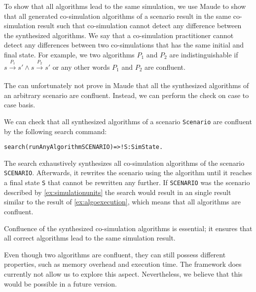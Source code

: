 To show that all algorithms lead to the same simulation, we use Maude to show that all generated co-simulation algorithms of a scenario result in the same co-simulation result such that co-simulation cannot detect any difference between the synthesized algorithms.
We say that a co-simulation practitioner cannot detect any differences between two co-simulations that has the same initial and final state.
For example, we two algorithms $P_1$ and $P_2$ are indistinguishable if $s \xrightarrow[\text{}]{P_1} s' \land s \xrightarrow[\text{}]{P_2} s'$ or any other words $P_1$ and $P_2$ are confluent.

The can unfortunately not prove in Maude that all the synthesized algorithms of an arbitrary scenario are confluent.
Instead, we can perform the check on case to case basis.  

\begin{example}
  We can check that all synthesized algorithms of a scenario \texttt{Scenario} are confluent by the following search command:
  \small
  \begin{alltt}
search (runAnyAlgorithm SCENARIO)  =>! S:SimState . 
  \end{alltt}
  \normalsize
The search exhaustively synthesizes all co-simulation algorithms of the scenario \texttt{SCENARIO}. 
Afterwards, it rewrites the scenario using the algorithm until it reaches a final state \texttt{S} that cannot be rewritten any further.
If \texttt{SCENARIO} was the scenario described by \cref{ex:simulationunits} the search would result in an single result similar to the result of \cref{ex:algoexecution}, which means that all algorithms are confluent.
\end{example}

Confluence of the synthesized co-simulation algorithms is essential; it ensures that all correct algorithms lead to the same simulation result.

Even though two algorithms are confluent, they can still possess different properties, such as memory overhead and execution time. 
The framework does currently not allow us to explore this aspect.
Nevertheless, we believe that this would be possible in a future version.